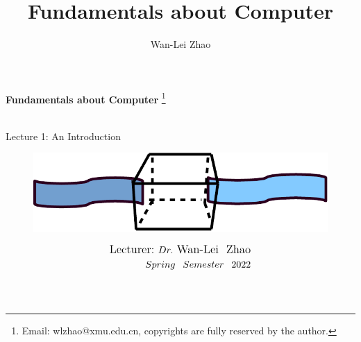 \documentclass[slidestop,dvips]{beamer}
\title{Fundamentals about Computer}
\author{Wan-Lei Zhao}
\newcommand\blfootnote[1]{
  \begingroup
  \renewcommand\thefootnote{}\footnote{#1}
  \addtocounter{footnote}{-1}
  \endgroup
}
\begin{document}
\begin{frame}
   \begin{center}
    \vspace{24pt}
    \Huge\textbf{Fundamentals about Computer}\blfootnote{Email: wlzhao@xmu.edu.cn, copyrights are fully reserved by the author.}\\
     \Huge{Lecture 1: An Introduction}
      \begin{figure}
     	\begin{center}
     		\includegraphics[width=0.3\linewidth]{figs/turingma.pdf}
     	\end{center}
     \end{figure}
    \vspace{36pt}
  \end{center}
  \begin{align*}
   \vspace{18pt}
      \large{\mbox{Lecturer:}~Dr.~\mbox{Wan-Lei~~Zhao}} \\
      \large{Spring~~Semester~~2022} \\
   \vspace{30pt}
  \end{align*}
\end{frame}





%
\section{}
\end{document}
